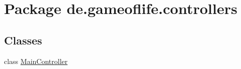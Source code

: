 \hypertarget{namespacede_1_1gameoflife_1_1controllers}{\section{Package de.\-gameoflife.\-controllers}
\label{namespacede_1_1gameoflife_1_1controllers}
}
\subsection*{Classes}
\begin{DoxyCompactItemize}
\item 
class \hyperlink{classde_1_1gameoflife_1_1controllers_1_1MainController}{Main\-Controller}
\end{DoxyCompactItemize}
